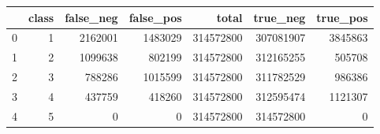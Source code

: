 \begin{tabular}{lrrrrrr}
\toprule
 & class & false_neg & false_pos & total & true_neg & true_pos \\
\midrule
0 & 1 & 2162001 & 1483029 & 314572800 & 307081907 & 3845863 \\
1 & 2 & 1099638 & 802199 & 314572800 & 312165255 & 505708 \\
2 & 3 & 788286 & 1015599 & 314572800 & 311782529 & 986386 \\
3 & 4 & 437759 & 418260 & 314572800 & 312595474 & 1121307 \\
4 & 5 & 0 & 0 & 314572800 & 314572800 & 0 \\
\bottomrule
\end{tabular}

